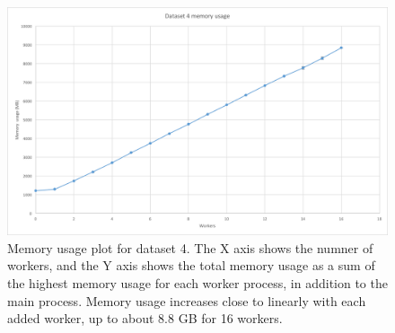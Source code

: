 \begin{figure}[ht]
  \centering
  \includegraphics[width=120mm]{figures/dataset_4/dataset_4_memory.png}
  \caption[Memory usage plot for dataset 4.]{Memory usage plot for dataset 4. The X axis shows the numner of workers, and the Y axis shows the total memory usage as
  a sum of the highest memory usage for each worker process, in addition to the main process. Memory usage increases close to linearly with each added worker,
  up to about 8.8 GB for 16 workers.}
  \label{fig:dataset_4_memory}
\end{figure}

